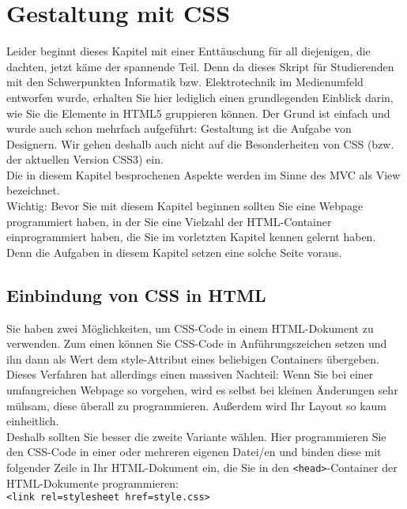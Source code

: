 \chapter{Gestaltung mit CSS}

Leider beginnt dieses Kapitel mit einer Enttäuschung für all diejenigen, die dachten, jetzt käme der spannende Teil. Denn da dieses Skript für Studierenden mit den Schwerpunkten Informatik bzw. Elektrotechnik im Medienumfeld entworfen wurde, erhalten Sie hier lediglich einen grundlegenden Einblick darin, wie Sie die Elemente in HTML5 gruppieren können. Der Grund ist einfach und wurde auch schon mehrfach aufgeführt: Gestaltung ist die Aufgabe von Designern. Wir gehen deshalb auch nicht auf die Besonderheiten von CSS (bzw. der aktuellen Version CSS3) ein.\\

Die in diesem Kapitel besprochenen Aspekte werden im Sinne des MVC als View bezeichnet.\\

Wichtig: Bevor Sie mit diesem Kapitel beginnen sollten Sie eine Webpage programmiert haben, in der Sie eine Vielzahl der HTML-Container einprogrammiert haben, die Sie im vorletzten Kapitel kennen gelernt haben. Denn die Aufgaben in diesem Kapitel setzen eine solche Seite voraus.

\section{Einbindung von CSS in HTML}

Sie haben zwei Möglichkeiten, um CSS-Code in einem HTML-Dokument zu verwenden. Zum einen können Sie CSS-Code in Anführungszeichen setzen und ihn dann als Wert dem style-Attribut eines beliebigen Containers übergeben. Dieses Verfahren hat allerdings einen massiven Nachteil: Wenn Sie bei einer umfangreichen Webpage so vorgehen, wird es selbst bei kleinen Änderungen sehr mühsam, diese überall zu programmieren. Außerdem wird Ihr Layout so kaum einheitlich.\\

Deshalb sollten Sie besser die zweite Variante wählen. Hier programmieren Sie den CSS-Code in einer oder mehreren eigenen Datei/en und binden diese mit folgender Zeile in Ihr HTML-Dokument ein, die Sie in den \verb|<head>|-Container der HTML-Dokumente programmieren:\\

\verb|<link rel=stylesheet href=style.css>|\\

